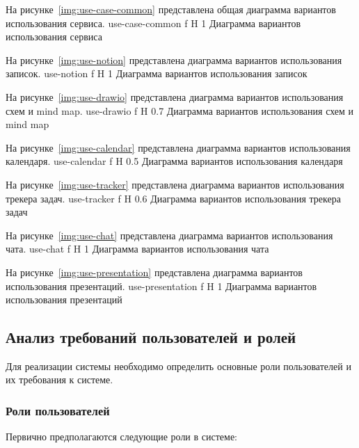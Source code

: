 На рисунке~\ref{img:use-case-common} представлена общая диаграмма вариантов использования сервиса.
	{use-case-common}
	{f}
	{H}
	{1\textwidth}
	{Диаграмма вариантов использования сервиса}
\clearpage

На рисунке~\ref{img:use-notion} представлена диаграмма вариантов использования записок.
	{use-notion}
	{f}
	{H}
	{1\textwidth}
	{Диаграмма вариантов использования записок}
\clearpage

На рисунке~\ref{img:use-drawio} представлена диаграмма вариантов использования схем и mind map.
	{use-drawio}
	{f}
	{H}
	{0.7\textwidth}
	{Диаграмма вариантов использования схем и mind map}

На рисунке~\ref{img:use-calendar} представлена диаграмма вариантов использования календаря.
	{use-calendar}
	{f}
	{H}
	{0.5\textwidth}
	{Диаграмма вариантов использования календаря}

\clearpage

На рисунке~\ref{img:use-tracker} представлена диаграмма вариантов использования трекера задач.
	{use-tracker}
	{f}
	{H}
	{0.6\textwidth}
	{Диаграмма вариантов использования трекера задач}

\clearpage

На рисунке~\ref{img:use-chat} представлена диаграмма вариантов использования чата.
	{use-chat}
	{f}
	{H}
	{1\textwidth}
	{Диаграмма вариантов использования чата}

\clearpage

На рисунке~\ref{img:use-presentation} представлена диаграмма вариантов использования презентаций.
	{use-presentation}
	{f}
	{H}
	{1\textwidth}
	{Диаграмма вариантов использования презентаций}

\clearpage

\subsection{Анализ требований пользователей и ролей}

Для реализации системы необходимо определить основные роли пользователей и их требования к системе.

\subsubsection{Роли пользователей}

Первично предполагаются следующие роли в системе:

